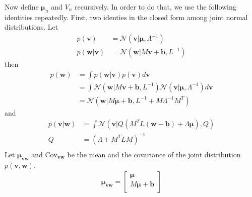 \documentclass[a4]{article}
\begin{document}
Now define $\bm{\mu}_n$ and $V_n$ recursively. In order to do that, we use the following identities repeatedly.
First, two identies in the closed form among joint normal distributions. Let
\begin{equation}
\begin{aligned}
p(\bm{v})        &= \mathcal{N}(\bm{v}|\bm{\mu}, \Lambda^{-1})\\
p(\bm{w}|\bm{v}) &= \mathcal{N}(\bm{w}|M\bm{v} + \bm{b}, L^{-1})
\end{aligned}
\end{equation}
then
\begin{equation}
\begin{aligned}
p(\bm{w}) &= \int p(\bm{w}|\bm{v})p(\bm{v}) d\bm{v}\\
&= \int \mathcal{N}(\bm{w}|M\bm{v} + \bm{b}, L^{-1})\mathcal{N}(\bm{v}|\bm{\mu}, \Lambda^{-1})d\bm{v}\\
&= \mathcal{N}(\bm{w}|M\bm{\mu} + \bm{b}, L^{-1} + M\Lambda^{-1}M^T)\label{eq:normal_marginal}
\end{aligned}
\end{equation}
and
\begin{equation}
\begin{aligned}
p(\bm{v|\bm{w}}) &= \int \mathcal{N}(\bm{v}|Q(M^TL(\bm{w}-\bm{b}) + \Lambda\bm{\mu}), Q)\\
Q &= (\Lambda + M^TLM)^{-1}\label{eq:normal_reverse_conditional}
\\
\end{aligned}
\end{equation}
Let $\bm{\mu}_{\bm{v}\bm{w}}$ and $\text{Cov}_{\bm{v}\bm{w}}$ be the mean and the covariance 
of the joint distribution $p(\bm{v}, \bm{w})$.
\begin{equation}
\begin{aligned}
\bm{\mu}_{\bm{v}\bm{w}} =
\begin{bmatrix}
\bm{\mu}\\
M\bm{\mu} + \bm{b}\\
\end{bmatrix}
\end{aligned}
\end{equation}
\end{document}
